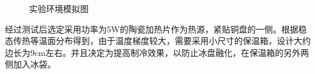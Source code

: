 \documentclass{article}
\begin{document}
\begin{figure}
	\caption{\heiti{}实验环境模拟图}
	
\end{figure}


经过测试后选定采用功率为5W的陶瓷加热片作为热源，紧贴铜盘的一侧。根据稳态传热等温面分布得到，由于温度梯度较大，需要采用小尺寸的保温箱，设计大约边长为9cm左右。并且决定为提高制冷效果，以防止冰盘融化，在保温箱的另外两侧加入冰袋。
\end{document}
